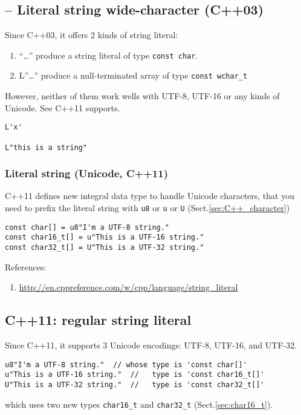 \subsection{-- Literal string wide-character (C++03)}

Since C++03, it offers 2 kinds of string literal:
\begin{enumerate}
  \item ``\ldots'' produce a string literal of type \verb!const char!.
  \item L''\ldots'' produce a null-terminated array of type \verb!const wchar_t!
\end{enumerate}
However, neither of them work wells with UTF-8, UTF-16 or any kinds of
Unicode. See C++11 supports.

\begin{verbatim}
L'x'

L"this is a string"
\end{verbatim}

\subsubsection{Literal string (Unicode, C++11)}

C++11 defines new integral data type to handle Unicode characters, that you need
to prefix the literal string with \verb!u8! or \verb!u! or \verb!U!
(Sect.\ref{sec:C++_character})
\begin{verbatim}
const char[] = u8"I'm a UTF-8 string."
const char16_t[] = u"This is a UTF-16 string."
const char32_t[] = U"This is a UTF-32 string."
\end{verbatim}


References:
\begin{enumerate}
  \item \url{http://en.cppreference.com/w/cpp/language/string_literal}
\end{enumerate}

\subsection{C++11: regular string literal}
\label{sec:regular-string-literal-C++11}

Since C++11, it supports 3 Unicode encodings: UTF-8, UTF-16, and UTF-32.
\begin{verbatim}
u8"I'm a UTF-8 string."  // whose type is 'const char[]'
u"This is a UTF-16 string."  //   type is 'const char16_t[]'
U"This is a UTF-32 string."  //   type is 'const char32_t[]'
\end{verbatim}
which uses two new types \verb!char16_t! and \verb!char32_t!
(Sect.\ref{sec:char16_t}).

